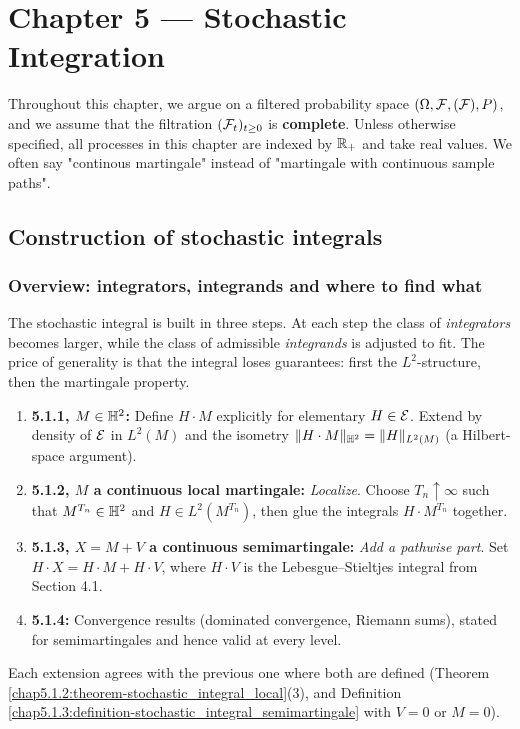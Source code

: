 \section{Chapter 5 --- Stochastic Integration}
Throughout this chapter, we argue on a filtered probability space $(\Omega, \mathcal{F}, (\mathcal{F}), P)$, and we assume that the filtration $(\mathcal{F}_t)_{t\geq0}$ is \textbf{complete}. Unless otherwise specified, all processes in this chapter are indexed by $\mathbb{R}_+$ and take real values. We often say "continous martingale" instead of "martingale with continuous sample paths". 

\subsection{Construction of stochastic integrals}

\subsubsection*{Overview: integrators, integrands and where to find what}
\label{chap5.1:overview}

The stochastic integral is built in three steps. At each step the class of \textit{integrators} becomes larger, while the class of admissible \textit{integrands} is adjusted to fit. The price of generality is that the integral loses guarantees: first the $L^2$-structure, then the martingale property.
\begin{enumerate}
    \item \textbf{5.1.1, $M\in\mathbb{H}^2$:} Define $H\cdot M$ explicitly for elementary $H\in\mathcal{E}$. Extend by density of $\mathcal{E}$ in $L^2(M)$ and the isometry $\|H\cdot M\|_{\mathbb{H}^2}=\|H\|_{L^2(M)}$ (a Hilbert-space argument).
    \item \textbf{5.1.2, $M$ a continuous local martingale:} \textit{Localize}. Choose $T_n\uparrow\infty$ such that $M^{T_n}\in\mathbb{H}^2$ and $H\in L^2(M^{T_n})$, then glue the integrals $H\cdot M^{T_n}$ together.
    \item \textbf{5.1.3, $X=M+V$ a continuous semimartingale:} \textit{Add a pathwise part}. Set $H\cdot X=H\cdot M+H\cdot V$, where $H\cdot V$ is the Lebesgue--Stieltjes integral from Section 4.1.
    \item \textbf{5.1.4:} Convergence results (dominated convergence, Riemann sums), stated for semimartingales and hence valid at every level.
\end{enumerate}
Each extension agrees with the previous one where both are defined (Theorem \ref{chap5.1.2:theorem-stochastic_integral_local}(3), and Definition \ref{chap5.1.3:definition-stochastic_integral_semimartingale} with $V=0$ or $M=0$).

